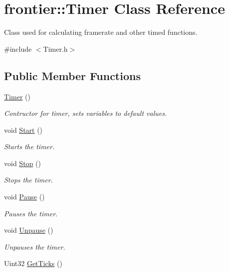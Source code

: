 \hypertarget{classfrontier_1_1_timer}{}\section{frontier\+:\+:Timer Class Reference}
\label{classfrontier_1_1_timer}


Class used for calculating framerate and other timed functions.  




{\ttfamily \#include $<$Timer.\+h$>$}

\subsection*{Public Member Functions}
\begin{DoxyCompactItemize}
\item 
\hyperlink{classfrontier_1_1_timer_a6aac1ba4a567320f54e8eee841e9c43b}{Timer} ()
\begin{DoxyCompactList}\small\item\em Contructor for timer, sets variables to default values. \end{DoxyCompactList}\item 
void \hyperlink{classfrontier_1_1_timer_a26c5d9aeddfcb91bea46d7f14b35e923}{Start} ()
\begin{DoxyCompactList}\small\item\em Starts the timer. \end{DoxyCompactList}\item 
void \hyperlink{classfrontier_1_1_timer_a878f61e350e7bb28350964f105192533}{Stop} ()
\begin{DoxyCompactList}\small\item\em Stops the timer. \end{DoxyCompactList}\item 
void \hyperlink{classfrontier_1_1_timer_a9d4c0d3d515cea7b5784ca7488b01d79}{Pause} ()
\begin{DoxyCompactList}\small\item\em Pauses the timer. \end{DoxyCompactList}\item 
void \hyperlink{classfrontier_1_1_timer_a18d0b8d623b50b64fb0893cd9dec56ce}{Unpause} ()
\begin{DoxyCompactList}\small\item\em Unpauses the timer. \end{DoxyCompactList}\item 
Uint32 \hyperlink{classfrontier_1_1_timer_ac34abf0e1fada4f0b1f97087c6b6747f}{Get\+Ticks} ()

\end{DoxyCompactItemize}
